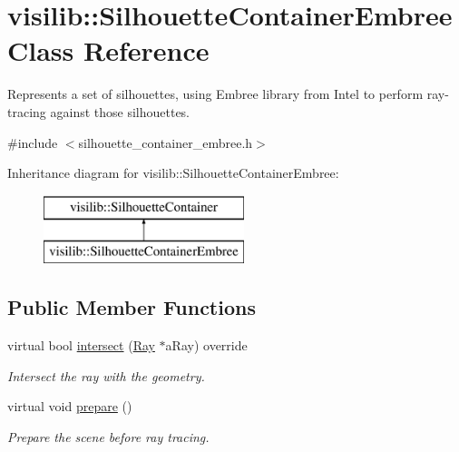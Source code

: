 \hypertarget{classvisilib_1_1_silhouette_container_embree}{}\section{visilib\+::Silhouette\+Container\+Embree Class Reference}
\label{classvisilib_1_1_silhouette_container_embree}


Represents a set of silhouettes, using Embree library from Intel to perform ray-\/tracing against those silhouettes.  




{\ttfamily \#include $<$silhouette\+\_\+container\+\_\+embree.\+h$>$}

Inheritance diagram for visilib\+::Silhouette\+Container\+Embree\+:\begin{figure}[H]
\begin{center}
\leavevmode
\includegraphics[height=2.000000cm]{classvisilib_1_1_silhouette_container_embree}
\end{center}
\end{figure}
\subsection*{Public Member Functions}
\begin{DoxyCompactItemize}
\item 
virtual bool \mbox{\hyperlink{classvisilib_1_1_silhouette_container_embree_a3a7290096b31163d775b11a356b7d3e0}{intersect}} (\mbox{\hyperlink{structvisilib_1_1_ray}{Ray}} $\ast$a\+Ray) override
\begin{DoxyCompactList}\small\item\em Intersect the ray with the geometry. \end{DoxyCompactList}\item 
virtual void \mbox{\hyperlink{classvisilib_1_1_silhouette_container_embree_ad3d6193f5484b3fb56096efd8a1230a8}{prepare}} ()
\begin{DoxyCompactList}\small\item\em Prepare the scene before ray tracing. \end{DoxyCompactList}\end{DoxyCompactItemize}
